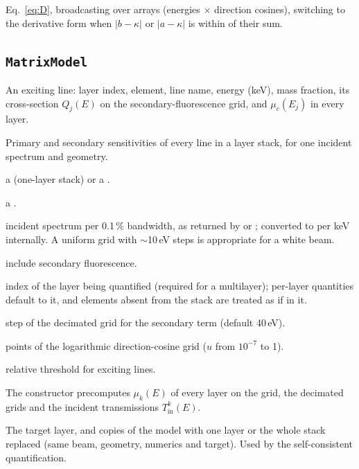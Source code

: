 Eq.~\eqref{eq:D}, broadcasting over arrays (energies $\times$ direction cosines), switching to
the derivative form when $|b-\kappa|$ or $|a-\kappa|$ is within  of their sum.

\subsection{\texttt{MatrixModel}}

An exciting line: layer index, element, line name, energy (keV), mass fraction, its
cross-section $Q_j(E)$ on the secondary-fluorescence grid, and $\mu_c(E_j)$ in every layer.

Primary and secondary sensitivities of every line in a layer stack, for one incident
spectrum and geometry.
\begin{args}
\item[sample] a  (one-layer stack) or a .
\item[geometry] a .
\item[energy\_kev, flux\_01bw] incident spectrum per 0.1\,\% bandwidth, as returned by
   or ; converted to per keV internally. A
  uniform grid with $\sim$10\,eV steps is appropriate for a white beam.
\item[secondary] include secondary fluorescence.
\item[target] index of the layer being quantified (required for a multilayer); per-layer
  quantities default to it, and elements absent from the stack are treated as if in it.
\item[sf\_step\_kev] step of the decimated grid for the secondary term (default 40\,eV).
\item[n\_u] points of the logarithmic direction-cosine grid ($u$ from $10^{-7}$ to 1).
\item[exciter\_min\_rel] relative threshold for exciting lines.
\end{args}
The constructor precomputes $\mu_k(E)$ of every layer on the grid, the decimated grids and
the incident transmissions $T_\mathrm{in}^k(E)$.

The target layer, and copies of the model with one layer or the whole stack replaced (same
beam, geometry, numerics and target). Used by the self-consistent quantification.

